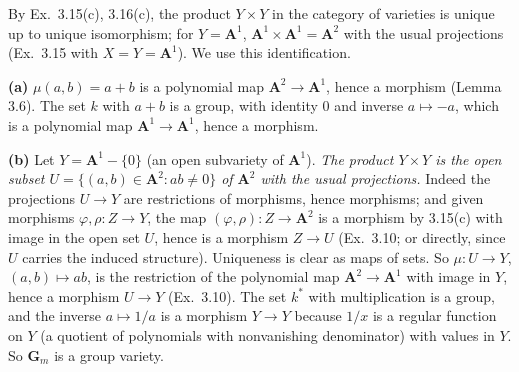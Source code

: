 \documentclass[11pt]{article}
\begin{document}
\pf
By Ex.~3.15(c), 3.16(c), the product $Y\times Y$ in the category of varieties is unique up to unique isomorphism; for $Y=\mathbf A^1$, $\mathbf A^1\times\mathbf A^1=\mathbf A^2$ with the usual projections (Ex.~3.15 with $X=Y=\mathbf A^1$). We use this identification.

\textbf{(a)} $\mu(a,b)=a+b$ is a polynomial map $\mathbf A^2\to\mathbf A^1$, hence a morphism (Lemma 3.6). The set $k$ with $a+b$ is a group, with identity $0$ and inverse $a\mapsto-a$, which is a polynomial map $\mathbf A^1\to\mathbf A^1$, hence a morphism.

\textbf{(b)} Let $Y=\mathbf A^1-\{0\}$ (an open subvariety of $\mathbf A^1$). \emph{The product $Y\times Y$ is the open subset $U=\{(a,b)\in\mathbf A^2:ab\ne0\}$ of $\mathbf A^2$ with the usual projections.} Indeed the projections $U\to Y$ are restrictions of morphisms, hence morphisms; and given morphisms $\varphi,\rho\colon Z\to Y$, the map $(\varphi,\rho)\colon Z\to\mathbf A^2$ is a morphism by 3.15(c) with image in the open set $U$, hence is a morphism $Z\to U$ (Ex.~3.10; or directly, since $U$ carries the induced structure). Uniqueness is clear as maps of sets. So $\mu\colon U\to Y$, $(a,b)\mapsto ab$, is the restriction of the polynomial map $\mathbf A^2\to\mathbf A^1$ with image in $Y$, hence a morphism $U\to Y$ (Ex.~3.10). The set $k^*$ with multiplication is a group, and the inverse $a\mapsto1/a$ is a morphism $Y\to Y$ because $1/x$ is a regular function on $Y$ (a quotient of polynomials with nonvanishing denominator) with values in $Y$. So $\mathbf G_m$ is a group variety.
\end{document}
